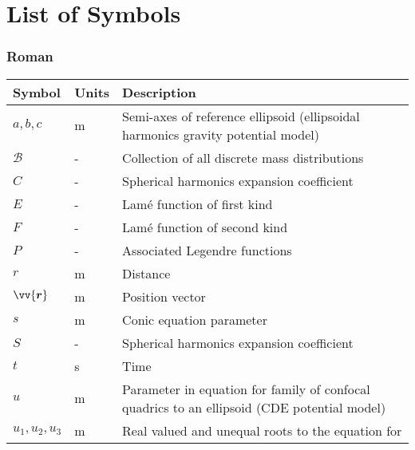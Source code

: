 \chapter*{List of Symbols}
\label{los}

\subsection*{Roman}
\begin{longtable}[l]{p{100pt} p{70pt} p{150pt}}
    \textbf{Symbol} & \textbf{Units} & \textbf{Description}                                 \\
    \hline
    $a, b, c$        & m                & Semi-axes of reference ellipsoid
                                          (ellipsoidal harmonics gravity potential model)   \\
    $\mathcal{B}$    & -                & Collection of all discrete mass distributions     \\
    $C$              & -                & Spherical harmonics expansion coefficient         \\
    $E$              & -                & Lam\'e function of first kind                     \\
    $F$              & -                & Lam\'e function of second kind                    \\
    $P$              & -                & Associated Legendre functions                     \\
    $r$              & m                & Distance                                          \\
    $\vv{\bm{r}}$    & m                & Position vector                                   \\
    $s$              & m                & Conic equation parameter                          \\
    $S$              & -                & Spherical harmonics expansion coefficient         \\
    $t$              & s                & Time                                              \\
    $u$              & m                & Parameter in equation for family of confocal
                                          quadrics to an ellipsoid (CDE potential model)    \\
    $u_1, u_2, u_3$  & m                & Real valued and unequal roots to the equation for

\end{longtable}
